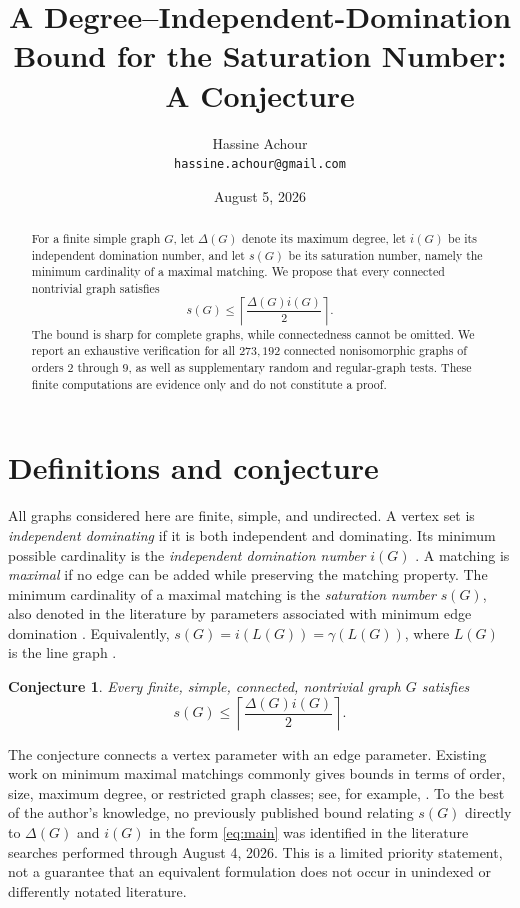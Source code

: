 \documentclass[11pt]{article}
\title{A Degree--Independent-Domination Bound for the Saturation Number: A Conjecture}
\author{Hassine Achour\\\texttt{hassine.achour@gmail.com}}
\date{August 5, 2026}
\newtheorem{conjecture}{Conjecture}
\newcommand{\sat}{s}
\begin{document}
\maketitle

\begin{abstract}
For a finite simple graph $G$, let $\Delta(G)$ denote its maximum degree, let $i(G)$ be its independent domination number, and let $\sat(G)$ be its saturation number, namely the minimum cardinality of a maximal matching. We propose that every connected nontrivial graph satisfies
\[
  \sat(G)\leq \left\lceil\frac{\Delta(G)i(G)}{2}\right\rceil.
\]
The bound is sharp for complete graphs, while connectedness cannot be omitted. We report an exhaustive verification for all $273{,}192$ connected nonisomorphic graphs of orders $2$ through $9$, as well as supplementary random and regular-graph tests. These finite computations are evidence only and do not constitute a proof.
\end{abstract}

\section{Definitions and conjecture}
All graphs considered here are finite, simple, and undirected. A vertex set is \emph{independent dominating} if it is both independent and dominating. Its minimum possible cardinality is the \emph{independent domination number} $i(G)$ \cite{goddard2013}. A matching is \emph{maximal} if no edge can be added while preserving the matching property. The minimum cardinality of a maximal matching is the \emph{saturation number} $\sat(G)$, also denoted in the literature by parameters associated with minimum edge domination \cite{yannakakis1980,tavakoli2023}. Equivalently, $\sat(G)=i(L(G))=\gamma(L(G))$, where $L(G)$ is the line graph \cite[Theorem~4.1]{tavakoli2023}.

\begin{conjecture}\label{conj:main}
Every finite, simple, connected, nontrivial graph $G$ satisfies
\begin{equation}\label{eq:main}
 \boxed{\quad \sat(G)\leq \left\lceil\frac{\Delta(G)i(G)}{2}\right\rceil.\quad}
\end{equation}
\end{conjecture}

The conjecture connects a vertex parameter with an edge parameter. Existing work on minimum maximal matchings commonly gives bounds in terms of order, size, maximum degree, or restricted graph classes; see, for example, \cite{baste2019,cames2020}. To the best of the author's knowledge, no previously published bound relating $\sat(G)$ directly to $\Delta(G)$ and $i(G)$ in the form \eqref{eq:main} was identified in the literature searches performed through August 4, 2026. This is a limited priority statement, not a guarantee that an equivalent formulation does not occur in unindexed or differently notated literature.
\end{document}

